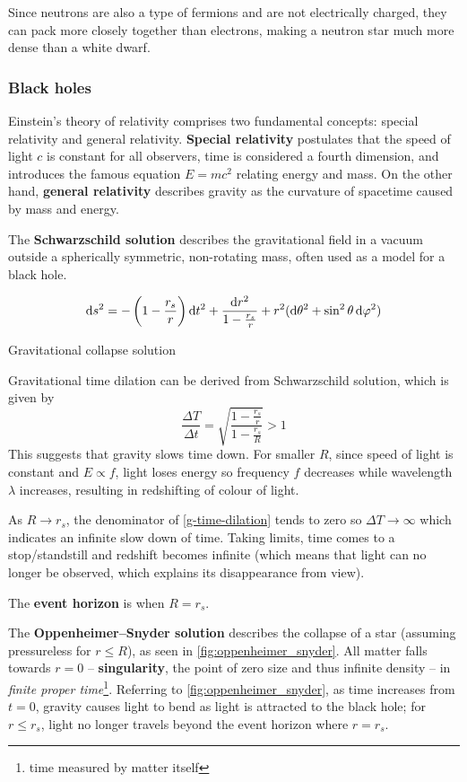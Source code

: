 \documentclass[12pt,a4paper]{article}
\begin{document}
Since neutrons are also a type of fermions and are not electrically charged, they can pack more closely together than electrons, making a neutron star much more dense than a white dwarf.

\subsubsection{Black holes}

Einstein's theory of relativity comprises two fundamental concepts: special relativity and general relativity. \textbf{Special relativity} postulates that the speed of light $c$ is constant for all observers, time is considered a fourth dimension, and introduces the famous equation $E=mc^2$ relating energy and mass. On the other hand, \textbf{general relativity} describes gravity as the curvature of spacetime caused by mass and energy.

The \textbf{Schwarzschild solution} describes the gravitational field in a vacuum outside a spherically symmetric, non-rotating mass, often used as a model for a black hole.

\begin{equation}
\dd{s^2} = -\left(1-\frac{r_s}{r}\right)\dd{t^2} + \frac{\dd{r^2}}{1-\frac{r_s}{r}} + r^2(\dd{\theta^2}+\sin^2\theta\dd{\varphi^2})
\end{equation}

Gravitational collapse solution

Gravitational time dilation can be derived from Schwarzschild solution, which is given by
\begin{equation}\label{g-time-dilation}
\frac{\Delta T}{\Delta t} = \sqrt{\frac{1-\frac{r_s}{r}}{1-\frac{r_s}{R}}} > 1
\end{equation}
This suggests that gravity slows time down. For smaller $R$, since speed of light is constant and $E \propto f$, light loses energy so frequency $f$ decreases while wavelength $\lambda$ increases, resulting in redshifting of colour of light.

As $R \to r_s$, the denominator of \cref{g-time-dilation} tends to zero so $\Delta T \to \infty$ which indicates an infinite slow down of time. Taking limits, time comes to a stop/standstill and redshift becomes infinite (which means that light can no longer be observed, which explains its disappearance from view).

The \textbf{event horizon} is when $R=r_s$.

The \textbf{Oppenheimer--Snyder solution} describes the collapse of a star (assuming pressureless for $r\le R$), as seen in \cref{fig:oppenheimer_snyder}. All matter falls towards $r=0$ -- \textbf{singularity}, the point of zero size and thus infinite density -- in \emph{finite proper time}\footnote{time measured by matter itself}. Referring to \cref{fig:oppenheimer_snyder}, as time increases from $t=0$, gravity causes light to bend as light is attracted to the black hole; for $r \le r_s$, light no longer travels beyond the event horizon where $r=r_s$.
\end{document}
